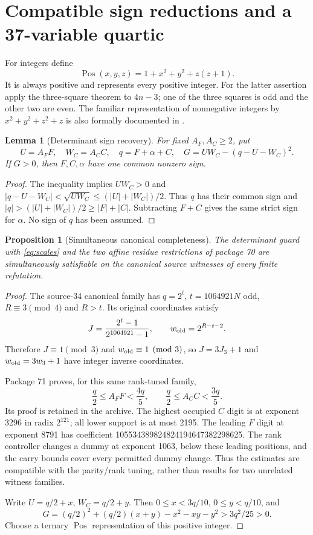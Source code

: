 \documentclass[11pt]{article}
\newtheorem{lemma}[theorem]{Lemma}
\newtheorem{proposition}[theorem]{Proposition}
\theoremstyle{remark}\newtheorem{remark}[theorem]{Remark}
\newcommand{\Pos}{\operatorname{Pos}}
\begin{document}
\section{Compatible sign reductions and a 37-variable quartic}
\label{sec:sign}

For integers define
\[
 \Pos(x,y,z)=1+x^2+y^2+z(z+1).
\]
It is always positive and represents every positive integer. For the
latter assertion apply the three-square theorem to $4n-3$; one of the
three squares is odd and the other two are even. The familiar
representation of nonnegative integers by $x^2+y^2+z^2+z$ is also
formally documented in \cite{threeSquares}.

\begin{lemma}[Determinant sign recovery]
For fixed $A_F,A_C\ge2$, put
\[
 U=A_FF,\quad W_C=A_CC,\quad q=F+\alpha+C,\quad
 G=UW_C-(q-U-W_C)^2.
\]
If $G>0$, then $F,C,\alpha$ have one common nonzero sign.
\end{lemma}
\begin{proof}
The inequality implies $UW_C>0$ and
$|q-U-W_C|<\sqrt{UW_C}\le(|U|+|W_C|)/2$.
Thus $q$ has their common sign and
$|q|>(|U|+|W_C|)/2\ge|F|+|C|$. Subtracting $F+C$ gives the same
strict sign for $\alpha$. No sign of $q$ has been assumed.
\end{proof}

\begin{proposition}[Simultaneous canonical completeness]
The determinant guard with \eqref{eq:scales} and the two affine residue
restrictions of package 70 are simultaneously satisfiable on the
canonical source witnesses of every finite refutation.
\end{proposition}
\begin{proof}
The source-34 canonical family has $q=2^t$, $t=1064921N$ odd,
$R\equiv3\pmod4$ and $R>t$. Its original coordinates satisfy
\[
 J=\frac{2^t-1}{2^{1064921}-1},\qquad
 w_{\rm old}=2^{R-t-2}.
\]
Therefore $J\equiv1\pmod3$ and $w_{\rm old}\equiv1\pmod3$, so
$J=3J_3+1$ and $w_{\rm old}=3w_3+1$ have integer inverse coordinates.

Package 71 proves, for this same rank-tuned family,
\[
 \frac q2\le A_FF<\frac{4q}{5},\qquad
 \frac q2\le A_CC<\frac{3q}{5}.               \label{eq:canonicalbox}
\]
Its proof is retained in the archive. The highest occupied $C$ digit is
at exponent 3296 in radix $2^{121}$; all lower support is at most 2195.
The leading $F$ digit at exponent 8791 has coefficient
105534389824824194647382298625. The rank controller changes a dummy
at exponent 1063, below these leading positions, and the carry bounds
cover every permitted dummy change. Thus the estimates are compatible
with the parity/rank tuning, rather than results for two unrelated
witness families.

Write $U=q/2+x$, $W_C=q/2+y$. Then
$0\le x<3q/10$, $0\le y<q/10$, and
\[
 G=(q/2)^2+(q/2)(x+y)-x^2-xy-y^2>3q^2/25>0.
\]
Choose a ternary $\Pos$ representation of this positive integer.
\end{proof}
\end{document}
